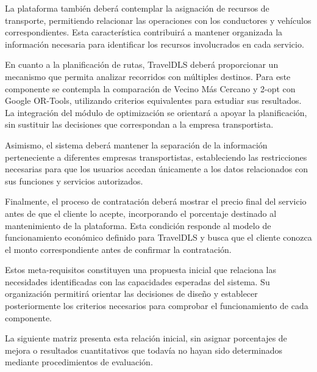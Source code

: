 La plataforma también deberá contemplar la asignación de recursos de transporte, permitiendo relacionar las operaciones con los conductores y vehículos correspondientes. Esta característica contribuirá a mantener organizada la información necesaria para identificar los recursos involucrados en cada servicio.

En cuanto a la planificación de rutas, TravelDLS deberá proporcionar un mecanismo que permita analizar recorridos con múltiples destinos. Para este componente se contempla la comparación de Vecino Más Cercano y 2-opt con Google OR-Tools, utilizando criterios equivalentes para estudiar sus resultados. La integración del módulo de optimización se orientará a apoyar la planificación, sin sustituir las decisiones que correspondan a la empresa transportista.

Asimismo, el sistema deberá mantener la separación de la información perteneciente a diferentes empresas transportistas, estableciendo las restricciones necesarias para que los usuarios accedan únicamente a los datos relacionados con sus funciones y servicios autorizados.

Finalmente, el proceso de contratación deberá mostrar el precio final del servicio antes de que el cliente lo acepte, incorporando el porcentaje destinado al mantenimiento de la plataforma. Esta condición responde al modelo de funcionamiento económico definido para TravelDLS y busca que el cliente conozca el monto correspondiente antes de confirmar la contratación.

Estos meta-requisitos constituyen una propuesta inicial que relaciona las necesidades identificadas con las capacidades esperadas del sistema. Su organización permitirá orientar las decisiones de diseño y establecer posteriormente los criterios necesarios para comprobar el funcionamiento de cada componente.

La siguiente matriz presenta esta relación inicial, sin asignar porcentajes de mejora o resultados cuantitativos que todavía no hayan sido determinados mediante procedimientos de evaluación.




